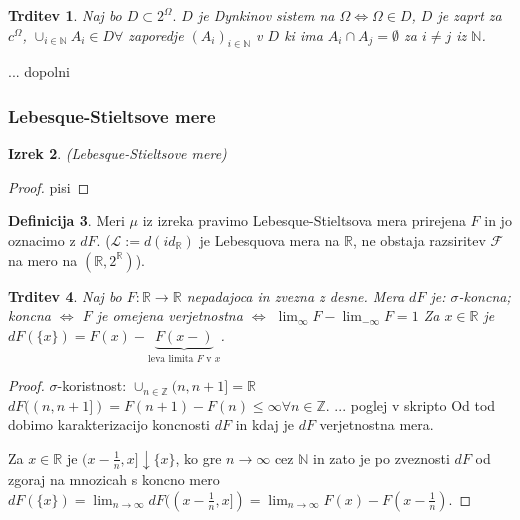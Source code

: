 \documentclass[a4paper,12pt]{article}
\theoremstyle{definition} %
\newtheorem{definicija}{Definicija}[section]
\theoremstyle{plain} %
\newtheorem{izrek}[definicija]{Izrek}
\newtheorem{trditev}[definicija]{Trditev}
\newcommand{\R}{\mathbb{R}}
\newcommand{\N}{\mathbb{N}}
\begin{document}
            \begin{trditev}
                Naj bo $D \subset 2^{\Omega}.$ $D$ je Dynkinov sistem na $\Omega \iff \Omega \in D$, $D$ je zaprt za $c^\Omega$, 
                $\cup_{i \in \N}A_i \in D \forall$ zaporedje $(A_i)_{i \in \N}$ v $D$ ki ima $A_i \cap A_j = \emptyset$ za $i \neq j$ iz $\N$.

            \end{trditev}


            ... dopolni


        \subsubsection{Lebesque-Stieltsove mere}
            \begin{izrek}
                (Lebesque-Stieltsove mere)
            \end{izrek}

            \begin{proof}
                pisi
            \end{proof}

            \begin{definicija}
                Meri $\mu$ iz izreka pravimo Lebesque-Stieltsova mera prirejena $F$ in jo oznacimo z $dF$.
                ($\mathcal{L}:= d(id_\R)$ je Lebesquova mera na $\R$, ne obstaja razsiritev $\mathcal{F}$ na mero na $(\R, 2^\R)$).
            \end{definicija}

            \begin{trditev}
                Naj bo $F:\R \rightarrow \R$ nepadajoca in zvezna z desne. Mera $dF$ je: $\sigma$-koncna; koncna $\iff$ $F$ je omejena
                verjetnostna $\iff$ $\lim_{\infty}F - \lim_{-\infty}F = 1$ Za $x \in \R$ je $dF(\{x\}) = F(x) - \underbrace{F(x-)}_{\text{leva limita $F$ v $x$}}$. 

            \end{trditev}
            \begin{proof}
                $\sigma$-koristnost: $\cup_{n \in \mathbb{Z}}(n, n+1]=\R$
                $dF((n, n+1]) = F(n + 1) - F(n) \leq \infty \forall n \in \mathbb{Z}$.
                ... poglej v skripto
                Od tod dobimo karakterizacijo koncnosti $dF$ in kdaj je $dF$ verjetnostna mera.

                Za $x \in \R$ je $(x - \frac{1}{n}, x] \downarrow \{x\}$, ko gre $n \rightarrow \infty$ cez $\N$ in zato je po zveznosti
                $dF$ od zgoraj na mnozicah s koncno mero $dF(\{x\}) = \lim_{n \rightarrow \infty}dF((x - \frac{1}{n}, x]) = \lim_{n \rightarrow \infty}F(x) - F(x - \frac{1}{n})$.
            \end{proof}
\end{document}
